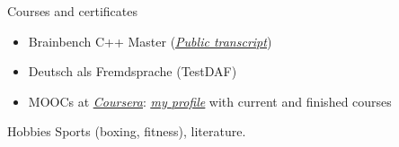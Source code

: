 \documentclass{resume} %
\newcommand{\hreftext}[1]{\underline{\textit{#1}}}
\begin{document}

\begin{rSection}{Courses and certificates}
\begin{itemize}
\item Brainbench C++ Master (\href{http://www.brainbench.com/content/transcript/topicdetail.do?testid=12320176}{\hreftext{Public transcript}})

\item Deutsch als Fremdsprache (TestDAF)

\item MOOCs at \href{http://coursera.org}{\hreftext{Coursera}}: \href{https://www.coursera.org/user/i/56a312ee9fc52bd72c3e7d5ab4399016}{\hreftext{my profile}} with current and finished courses

\end{itemize}
\end{rSection}


\begin{rSection}{Hobbies}
Sports (boxing, fitness), literature.
\end{rSection}

\end{document}
